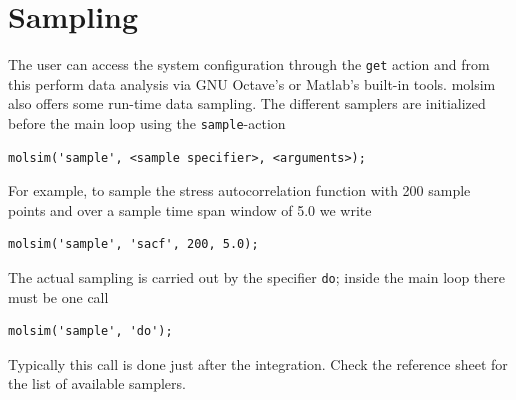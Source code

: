 \documentclass[11pt]{article}
\begin{document}
\section{Sampling}
The user can access the system configuration through the \verb!get! action and
from this perform data analysis via GNU Octave's or Matlab's built-in
tools. \textsf{molsim} also offers some run-time data sampling. The different
samplers are initialized before the main loop using the \verb!sample!-action
\begin{verbatim}
molsim('sample', <sample specifier>, <arguments>);
\end{verbatim}
For example, to sample the stress autocorrelation function with 200 sample points
and over a sample time span window of 5.0 we write
\begin{verbatim}
molsim('sample', 'sacf', 200, 5.0);
\end{verbatim}
The actual sampling is carried out by the specifier \verb!do!; inside the main
loop there must be one call
\begin{verbatim}
molsim('sample', 'do'); 
\end{verbatim}
Typically this call is done just after the integration. Check the reference
sheet for the list of available samplers. 
\end{document}
